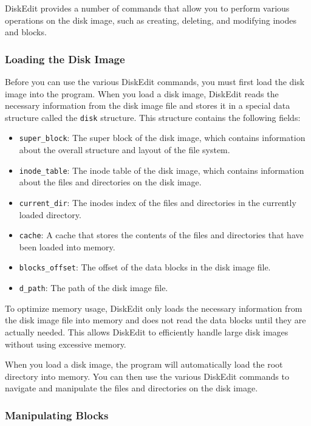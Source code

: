 \documentclass{article}
\begin{document}
DiskEdit provides a number of commands that allow you to perform various operations on the disk image, such as creating, deleting, and modifying inodes and blocks.

\subsubsection{Loading the Disk Image}

Before you can use the various DiskEdit commands, you must first load the disk image into the program. When you load a disk image, DiskEdit reads the necessary information from the disk image file and stores it in a special data structure called the \texttt{disk} structure. This structure contains the following fields:

\begin{itemize}
    \item \texttt{super\_block}: The super block of the disk image, which contains information about the overall structure and layout of the file system.
    \item \texttt{inode\_table}: The inode table of the disk image, which contains information about the files and directories on the disk image.
    \item \texttt{current\_dir}: The inodes index of the files and directories in the currently loaded directory.
    \item \texttt{cache}: A cache that stores the contents of the files and directories that have been loaded into memory.
    \item \texttt{blocks\_offset}: The offset of the data blocks in the disk image file.
    \item \texttt{d\_path}: The path of the disk image file.
\end{itemize}

To optimize memory usage, DiskEdit only loads the necessary information from the disk image file into memory and does not read the data blocks until they are actually needed. This allows DiskEdit to efficiently handle large disk images without using excessive memory.

When you load a disk image, the program will automatically load the root directory into memory. You can then use the various DiskEdit commands to navigate and manipulate the files and directories on the disk image.

\subsubsection{Manipulating Blocks}
\end{document}
